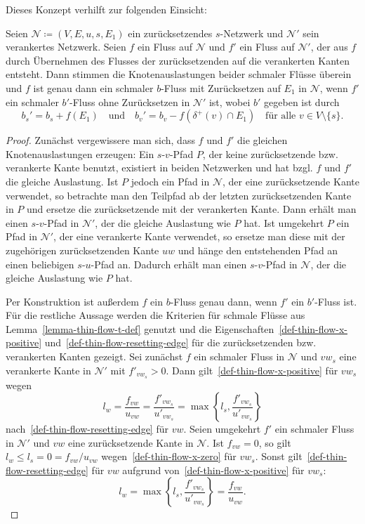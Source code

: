 Dieses Konzept verhilft zur folgenden Einsicht:
\begin{lemma}\label{lemma-thin-flows-anchored-networks}
	Seien $\mathcal{N}\coloneq (V, E, u, s, E_1)$ ein zurücksetzendes $s$-Netzwerk und $\mathcal{N}'$ sein verankertes Netzwerk.
	Seien $f$ ein Fluss auf $\mathcal{N}$ und $f'$ ein Fluss auf $\mathcal{N}'$, der aus $f$ durch Übernehmen des Flusses der zurücksetzenden auf die verankerten Kanten entsteht.
	Dann stimmen die Knotenauslastungen beider schmaler Flüsse überein und
	$f$ ist genau dann ein schmaler $b$-Fluss mit Zurücksetzen auf $E_1$ in $\mathcal{N}$, wenn $f'$ ein schmaler $b'$-Fluss ohne Zurücksetzen in $\mathcal{N}'$ ist, wobei $b'$ gegeben ist durch
	\[
		b_s' = b_s + f(E_1) \text{~~ und ~~} b_v' = b_v - f(\delta^+(v)\cap E_1) \text{~~ für alle $v\in V\setminus \{s \}$}.
	\]
\end{lemma}
\begin{proof}
	Zunächst vergewissere man sich, dass $f$ und $f'$ die gleichen Knotenauslastungen erzeugen:
	Ein $s$-$v$-Pfad $P$, der keine zurücksetzende bzw. verankerte Kante benutzt, existiert in beiden Netzwerken und hat bzgl. $f$ und $f'$ die gleiche Auslastung.
	Ist $P$ jedoch ein Pfad in $\mathcal{N}$, der eine zurücksetzende Kante verwendet, so betrachte man den Teilpfad ab der letzten zurücksetzenden Kante in $P$ und ersetze die zurücksetzende mit der verankerten Kante.
	Dann erhält man einen $s$-$v$-Pfad in $\mathcal{N}'$, der die gleiche Auslastung wie $P$ hat.
	Ist umgekehrt $P$ ein Pfad in $\mathcal{N}'$, der eine verankerte Kante verwendet, so ersetze man diese mit der zugehörigen zurücksetzenden Kante $uw$ und hänge den entstehenden Pfad an einen beliebigen $s$-$u$-Pfad an.
	Dadurch erhält man einen $s$-$v$-Pfad in $\mathcal{N}$, der die gleiche Auslastung wie $P$ hat.
	
	Per Konstruktion ist außerdem $f$ ein $b$-Fluss genau dann, wenn $f'$ ein $b'$-Fluss ist.
	Für die restliche Aussage werden die Kriterien für schmale Flüsse aus Lemma~\ref{lemma-thin-flow-t-def} genutzt und die Eigenschaften~\ref{def-thin-flow-x-positive} und~\ref{def-thin-flow-resetting-edge} für die zurücksetzenden bzw. verankerten Kanten gezeigt.
	Sei zunächst $f$ ein schmaler Fluss in $\mathcal{N}$ und $vw_s$ eine verankerte Kante in $\mathcal{N'}$ mit $f'_{vw_s} > 0$.
	Dann gilt~\ref{def-thin-flow-x-positive} für $vw_s$ wegen
	\[ l_w = \frac{f_{vw}}{u_{vw}} = \frac{f'_{vw_s}}{u'_{vw_s}} = \max\left\{ l_s, \frac{f'_{vw_s}}{u'_{vw_s}} \right\} \]
	nach~\ref{def-thin-flow-resetting-edge} für $vw$.
	Seien umgekehrt $f'$ ein schmaler Fluss in $\mathcal{N}'$ und $vw$ eine zurück\-setzende Kante in $\mathcal{N}$.
	Ist $f_{vw} = 0$, so gilt $l_w \leq l_s = 0 = f_{vw}/u_{vw}$ wegen~\ref{def-thin-flow-x-zero} für $vw_s$.
	Sonst gilt~\ref{def-thin-flow-resetting-edge} für $vw$ aufgrund von~\ref{def-thin-flow-x-positive} für $vw_s$:
	\[
		l_w = \max\left\{ l_s, \frac{f'_{vw_s}}{u'_{vw_s}} \right\} = \frac{f_{vw}}{u_{vw}}.
	\]
\end{proof}

